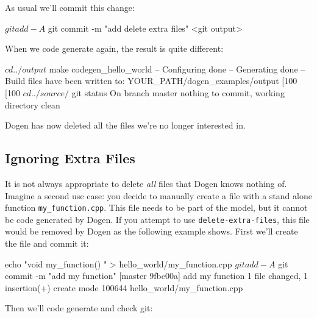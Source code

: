 \documentclass{book}
\begin{document}
As usual we'll commit this change:

\begin{pseudocode}[backgroundcolor=\color{lightgray}]
$ git add -A
$ git commit -m "add delete extra files"
<git output>
\end{pseudocode}

When we code generate again, the result is quite different:

\begin{pseudocode}[backgroundcolor=\color{lightgray}]
$ cd ../output
$ make codegen_hello_world
-- Configuring done
-- Generating done
-- Build files have been written to: YOUR_PATH/dogen_examples/output
[100%
[100%
$ cd ../source/
$ git status
On branch master
nothing to commit, working directory clean
\end{pseudocode}

Dogen has now deleted all the files we're no longer interested in.

\subsection{Ignoring Extra Files}

It is not always appropriate to delete \emph{all} files that Dogen
knows nothing of. Imagine a second use case: you decide to manually
create a file with a stand alone function
\texttt{my\_function.cpp}. This file needs to be part of the model,
but it cannot be code generated by Dogen. If you attempt to use
\texttt{delete-extra-files}, this file would be removed by Dogen as
the following example shows. First we'll create the file and commit
it:

\begin{pseudocode}[backgroundcolor=\color{lightgray}]
echo "void my_function() { }" > hello_world/my_function.cpp
$ git add -A
$ git commit -m "add my function"
[master 9fbc00a] add my function
1 file changed, 1 insertion(+)
create mode 100644 hello_world/my_function.cpp
\end{pseudocode}

Then we'll code generate and check git:

\end{document}
